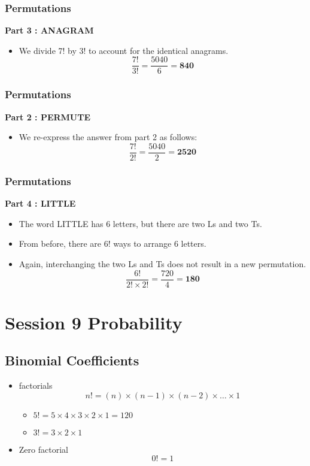 \documentclass[]{report}
\begin{document}
\begin{frame}
\frametitle{Permutations}
\Large
\vspace{-0.1cm}
\textbf{Part 3 : ANAGRAM}\\
\begin{itemize}
\item We divide 7! by 3! to account for the identical anagrams.
\LARGE
\[\frac{7!}{3!} =  \frac{5040}{6} = \boldsymbol{840} \]
\end{itemize}
\end{frame}
\begin{frame}
\frametitle{Permutations}
\Large
\vspace{-2.3cm}
\textbf{Part 2 : PERMUTE}\\
\begin{itemize}
\item We re-express the answer from part 2 as follows:
\LARGE
\[\frac{7!}{2!} =  \frac{5040}{2} = \boldsymbol{2520} \]
\end{itemize}
\end{frame}
\begin{frame}
\frametitle{Permutations}
\Large
\vspace{-0.3cm}
\textbf{Part 4 : LITTLE}\\
\begin{itemize}
\item The word LITTLE has 6 letters, but there are two Ls and two Ts.
\item From before, there are 6! ways to arrange 6 letters.
\item Again, interchanging the two Ls and Ts does not result in a new permutation. 
\LARGE
\[\frac{6!}{2!\times 2!} =  \frac{720}{4} = \boldsymbol{180} \]
\end{itemize}
\end{frame}
\section*{Session 9 Probability}
\subsection*{Binomial Coefficients}
\begin{itemize}
\item factorials 
\[ n! = (n)\times (n-1)\times(n-2) \times \ldots \times 1 \]
\begin{itemize}
\item $5! = 5 \times 4 \times 3 \times 2 \times 1 = 120 $
\item $3! = 3 \times 2 \times 1$
\end{itemize}
\item Zero factorial
\[ 0! =  1 \]
\end{itemize}
\end{document}
